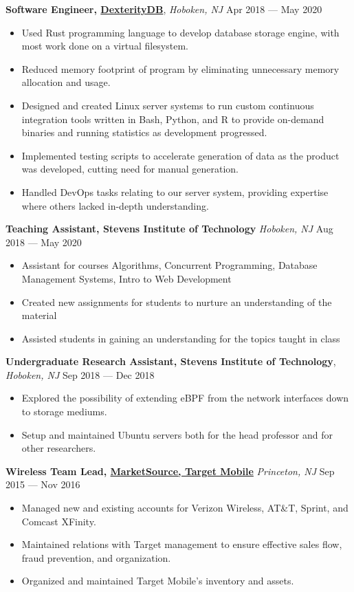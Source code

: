 \documentclass[10pt,letterpaper,roman]{moderncv}
\begin{document}
\textbf{Software Engineer, \href{https://dexteritydb.com}{DexterityDB}},
\textit{Hoboken, NJ} \hfill Apr 2018 --- May 2020
\begin{itemize}
\item Used Rust programming language to develop database storage engine, with
  most work done on a virtual filesystem.
\item Reduced memory footprint of program by eliminating unnecessary memory
  allocation and usage.
\item Designed and created Linux server systems to run custom continuous
  integration tools written in Bash, Python, and R to provide on-demand binaries
  and running statistics as development progressed.
\item Implemented testing scripts to accelerate generation of data as the
  product was developed, cutting need for manual generation.
\item Handled DevOps tasks relating to our server system, providing expertise
  where others lacked in-depth understanding.
\end{itemize}\space

\hfill

\textbf{Teaching Assistant, Stevens Institute of Technology} \textit{Hoboken,
  NJ} \hfill Aug 2018 --- May 2020
\begin{itemize}
\item Assistant for courses Algorithms, Concurrent Programming, Database
  Management Systems, Intro to Web Development
\item Created new assignments for students to nurture an understanding of the
  material
\item Assisted students in gaining an understanding for the topics taught in
  class
\end{itemize}

\hfill

\textbf{Undergraduate Research Assistant, Stevens Institute of Technology},
\textit{Hoboken, NJ} \hfill Sep 2018 --- Dec 2018
\begin{itemize}
\item Explored the possibility of extending eBPF from the network interfaces
  down to storage mediums.
\item Setup and maintained Ubuntu servers both for the head professor and for
  other researchers.
\end{itemize}

\hfill

\textbf{Wireless Team Lead, \href{https://www.marketsource.com/}{MarketSource,
    Target Mobile}} \textit{Princeton, NJ} \hfill Sep 2015 --- Nov 2016
\begin{itemize}
\item Managed new and existing accounts for Verizon Wireless, AT\&T, Sprint, and
  Comcast XFinity.
\item Maintained relations with Target management to ensure effective sales
  flow, fraud prevention, and organization.
\item Organized and maintained Target Mobile's inventory and assets.
\end{itemize}
\end{document}
